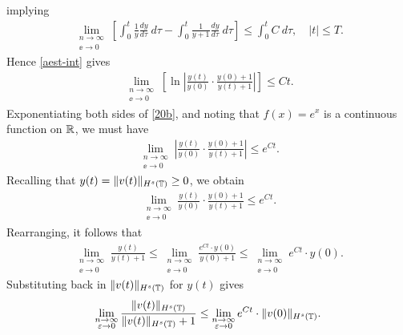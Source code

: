 implying
\begin{equation}
	\label{aest-int}
	\begin{split}
		\lim_{\substack{n \to \infty \\ \ee \to 0} } \left [
\int_0^t \frac{1}{y} \frac{dy}{d \tau} \ d \tau
		- \int_0^t \frac{1}{y+1} \frac{dy}{d \tau} \ d \tau \right ]
		\le \int_0^t C \ d \tau, \quad |t| \le T.
	\end{split}
\end{equation}
Hence \eqref{aest-int} gives 
\begin{equation}
	\begin{split}
	\lim_{\substack{n \to \infty \\ \ee \to 0} }	\left [ \ln \left | \frac{y(t)}{y(0)}
	\cdot \frac{y(0) + 1}{y(t) + 1} \right | \right ] \le C t.
		\label{20b}
	\end{split}
\end{equation}
Exponentiating both sides of \eqref{20b}, and noting that $f(x) = e^x$
is a continuous function on $\mathbb{R}$, we must have
\begin{equation*}
	\begin{split}
		\lim_{\substack{n \to \infty \\ \ee \to 0} }	
		\left |
		\frac{y(t)}{y(0)} \cdot \frac{y(0) + 1}{y(t) + 1} \right | \le e^{C t}.
	\end{split}
\end{equation*}
Recalling that $y(t) = \|v(t)\|_{H^s(\mathbb{T})} \ge 0$, we obtain
\begin{equation*}
	\begin{split}
		\lim_{\substack{n \to \infty \\ \ee \to 0} }	
		\frac{y(t)}{y(0)} \cdot \frac{y(0) + 1}{y(t) + 1} \le e^{C t}.
	\end{split}
\end{equation*}
Rearranging, it follows that 
\begin{equation*}
	\begin{split}
		\lim_{\substack{n \to \infty \\ \ee \to 0}} \frac{y(t)}{y(t) + 1}
		\le \lim_{\substack{n \to \infty \\ \ee \to 0}} \frac{e^{C t} \cdot y(0)}{y(0) + 1} \le
		\lim_{\substack{n \to \infty \\ \ee \to 0}} e^{C t} \cdot y(0).
	\end{split}
\end{equation*}
Substituting back in $\|v(t)\|_{H^s(\mathbb{T})}$ for $y(t)$ gives
\begin{equation}
	\begin{split}
		\lim_{\substack{n \to \infty \\ \varepsilon \to 0}}	\frac{\|v(t)\|_{H^s(\mathbb{T})}}{\|v(t)\|_{H^s(\mathbb{T})} + 1}  \le
		\lim_{\substack{n \to \infty \\ \varepsilon \to 0}} e^{C t} \cdot \|v(0)\|_{H^s(\mathbb{T})}.
		\label{a303qx}
	\end{split}
\end{equation}
